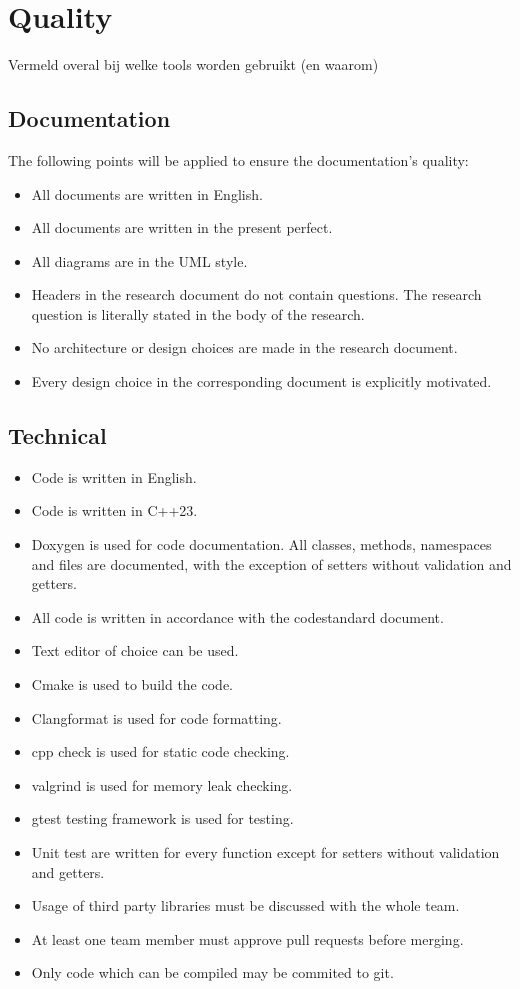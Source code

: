 \documentclass{article} %
\begin{document}
    \newpage

    \section{Quality}
    Vermeld overal bij welke tools worden gebruikt (en waarom)
    \subsection{Documentation}
    The following points will be applied to ensure the documentation’s quality:
    \begin{itemize}
        \item All documents are written in English.
        \item All documents are written in the present perfect.
        \item All diagrams are in the UML style.
        \item Headers in the research document do not contain questions. The research question is literally stated in the body of the research.
        \item No architecture or design choices are made in the research document.
        \item Every design choice in the corresponding document is explicitly motivated.
    \end{itemize}
    \subsection{Technical}
    \begin{itemize}
        \item Code is written in English.
        \item Code is written in C++23.
        \item Doxygen is used for code documentation. All classes, methods, namespaces and files are documented, with the exception of setters without validation and getters.
        \item All code is written in accordance with the codestandard document.
        \item Text editor of choice can be used.
        \item Cmake is used to build the code.
        \item Clangformat is used for code formatting.
        \item cpp check is used for static code checking.
        \item valgrind is used for memory leak checking.
        \item gtest testing framework is used for testing.
        \item Unit test are written for every function except for setters without validation and getters.
        \item Usage of third party libraries must be discussed with the whole team.
        \item At least one team member must approve pull requests before merging.
        \item Only code which can be compiled may be commited to git.
    \end{itemize}
\end{document}
